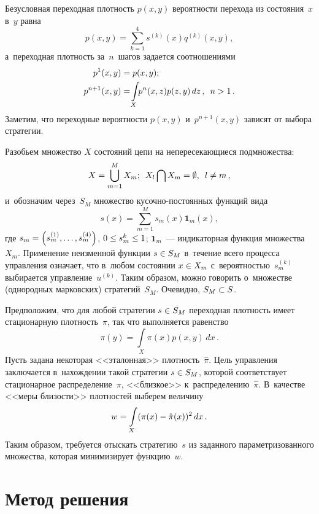 \begin{multicols}{2}
  Безусловная переходная плотность $p(x,y)$ вероятности перехода из 
состояния~$x$ в~$y$ равна 
$$
p(x,y)= \sum\limits^4_{k=1} s^{(k)}(x) 
q^{(k)}(x,y),
$$
 а~переходная плот\-ность за~$n$~шагов задается 
соотношениями
 \begin{align*}
 p^1(x,y) &=p(x,y);\\
p^{n+1}(x,y)&=\!\int\limits_X\!\! p^n(x,z) p(z,y)\,dz\,,\enskip
 n>1\,.
\end{align*}
Заметим, что переходные вероятности $p(x,y)$ и~$p^{n+1}(x,y)$ зависят от 
выбора стратегии. 
  
  Разобьем множество $X$ со\-сто\-яний цепи на не\-пе\-ре\-се\-ка\-ющи\-еся 
подмножества: 
$$
X= \mathop{\bigcup}\limits^M_{m=1} X_m;\enskip 
X_l\mathop{\bigcap} X_m =\emptyset,\enskip l\not= m\,,
$$
 и~обозначим через~$S_M$ множество  
ку\-соч\-но-по\-сто\-ян\-ных функций вида 
$$
s(x)= \sum\limits^M_{m=1} 
s_m(x)\mathbf{1}_m(x),
$$
 где $s_m\hm= \left( s_m^{(1)}, \ldots , 
s_m^{(4)}\right)$, $0\hm\leq s_m^k \hm\leq 1$; $\mathbf{1}_m$~--- 
индикаторная функция множества~$X_m$. Применение неизменной 
функции $s\hm\in S_M$ в~течение всего процесса управ\-ле\-ния означает, что 
в~любом со\-сто\-янии $x\hm\in X_m$ с~ве\-ро\-ят\-ностью~$s_m^{(k)}$ выбирается 
управ\-ле\-ние~$u^{(k)}$. Таким образом, можно говорить о~множестве 
(однородных марковских) стратегий~$S_M$. Очевидно, $S_M\hm\subset S$. 
  
  Предположим, что для любой стратегии $s\hm\in S_M$ переходная 
плот\-ность имеет стационарную плот\-ность~$\pi$, так что выполняется 
равенство 
$$
\pi(y)= \int\limits_X \pi(x) p(x,y)\,dx\,.
$$
 Пусть задана некоторая 
<<эталонная>> плот\-ность~$\hat{\pi}$. Цель управ\-ле\-ния заключается 
в~нахождении такой стратегии $s\hm\in S_M$, которой соответствует 
стационарное распределение~$\pi$, <<близкое>> 
к~распределению~$\hat{\pi}$. В~качестве <<меры бли\-зости>> плотностей 
выберем величину 
$$
w= \int\limits_X (\pi(x)\hm- \hat{\pi}(x))^2\,dx\,. 
$$
Таким образом, требуется отыскать стратегию~$s$ из заданного 
па\-ра\-мет\-ри\-зо\-ван\-но\-го множества, которая минимизирует функцию~$w$. 
  
  \section{Метод решения}
  

\end{multicols}
